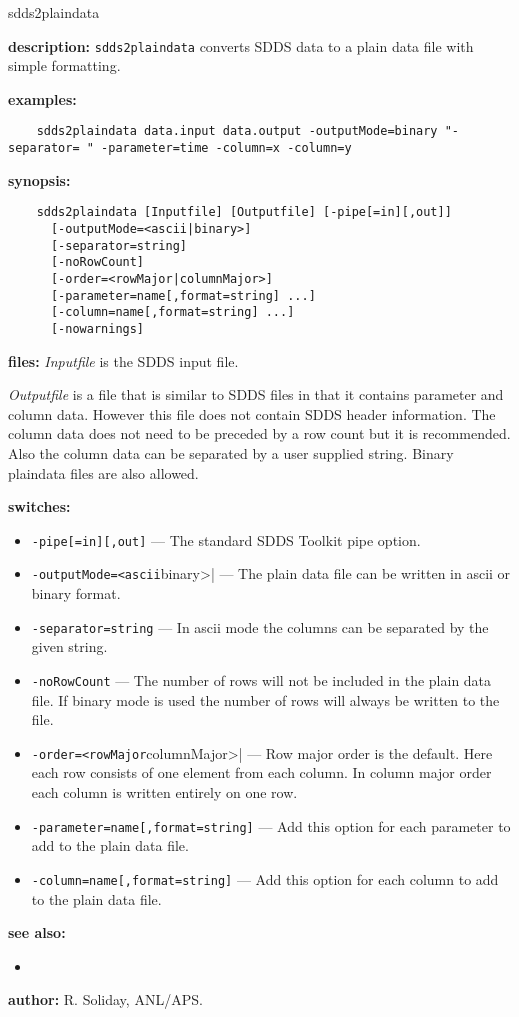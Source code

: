 \begin{sddsprog}{sdds2plaindata}
  \item \textbf{description:} \verb|sdds2plaindata| converts SDDS data to a plain data file with simple formatting.
  \item \textbf{examples:}
    \begin{verbatim}
    sdds2plaindata data.input data.output -outputMode=binary "-separator= " -parameter=time -column=x -column=y
    \end{verbatim}
  \item \textbf{synopsis:}
    \begin{verbatim}
    sdds2plaindata [Inputfile] [Outputfile] [-pipe[=in][,out]]
      [-outputMode=<ascii|binary>]
      [-separator=string]
      [-noRowCount]
      [-order=<rowMajor|columnMajor>]
      [-parameter=name[,format=string] ...]
      [-column=name[,format=string] ...]
      [-nowarnings]
    \end{verbatim}
  \item \textbf{files:}
    \emph{Inputfile} is the SDDS input file.

    \emph{Outputfile} is a file that is similar to SDDS files in that it contains parameter and column data. However this file does not contain SDDS header information. The column data does not need to be preceded by a row count but it is recommended. Also the column data can be separated by a user supplied string. Binary plaindata files are also allowed.
  \item \textbf{switches:}
    \begin{itemize}
      \item \verb|-pipe[=in][,out]| --- The standard SDDS Toolkit pipe option.
      \item \verb|-outputMode=<ascii|binary>| --- The plain data file can be written in ascii or binary format.
      \item \verb|-separator=string| --- In ascii mode the columns can be separated by the given string.
      \item \verb|-noRowCount| --- The number of rows will not be included in the plain data file. If binary mode is used the number of rows will always be written to the file.
      \item \verb|-order=<rowMajor|columnMajor>| --- Row major order is the default. Here each row consists of one element from each column. In column major order each column is written entirely on one row.
      \item \verb|-parameter=name[,format=string]| --- Add this option for each parameter to add to the plain data file.
      \item \verb|-column=name[,format=string]| --- Add this option for each column to add to the plain data file.
    \end{itemize}
  \item \textbf{see also:}
    \begin{itemize}
      \item {}
    \end{itemize}
  \item \textbf{author:} R. Soliday, ANL/APS.
\end{sddsprog}
